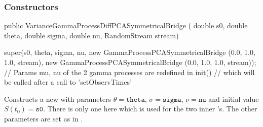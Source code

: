 \subsubsection* {Constructors}
\begin{code}

public VarianceGammaProcessDiffPCASymmetricalBridge (
                                               double s0, double theta, 
                                               double sigma, double nu, 
                                               RandomStream stream) \begin{hide} {
    super(s0, theta, sigma, nu, new GammaProcessPCASymmetricalBridge (0.0, 1.0, 1.0, stream),
	  new GammaProcessPCASymmetricalBridge (0.0, 1.0, 1.0, stream));
    // Params mu, nu of the 2 gamma processes are redefined in init()
    // which will be called after a call to 'setObservTimes'
}
\end{hide}
\end{code}
\begin{tabb}Constructs a new 
 with 
parameters  $\theta = \texttt{theta}$, $\sigma = \texttt{sigma}$, $\nu = \texttt{nu}$ 
and initial value $S(t_{0}) = \texttt{s0}$.  There is only
one  here which is
used for the two inner 's.  The other
parameters are set as in .
\end{tabb}

\begin{code}\begin{hide}
}
\end{hide}\end{code}



